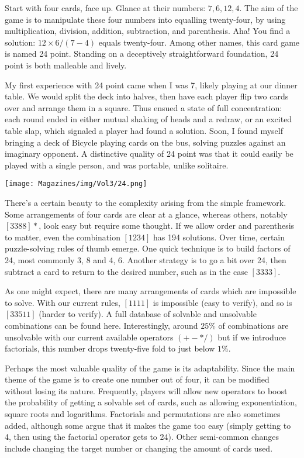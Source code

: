 \documentclass{article}
\begin{document}
\begin{multicols}{3}
Start with four cards, face up. Glance at their numbers: $7, 6, 12, 4$. The aim of the game is to manipulate these four numbers into equalling twenty-four, by using multiplication, division, addition, subtraction, and parenthesis. Aha! You find a solution:  $12 \times 6 / (7-4)$ equals twenty-four. Among other names, this card game is named 24 point. Standing on a deceptively straightforward foundation, 24 point is both malleable and lively. 

My first experience with 24 point came when I was 7, likely playing at our dinner table. We would split the deck into halves, then have each player flip two cards over and arrange them in a square. Thus ensued a state of full concentration: each round ended in either mutual shaking of heads and a redraw, or an excited table slap, which signaled a player had found a solution. Soon, I found myself bringing a deck of Bicycle playing cards on the bus, solving puzzles against an imaginary opponent. A distinctive quality of 24 point was that it could easily be played with a single person, and was portable, unlike solitaire. 

\begin{center}
\texttt{[image: Magazines/img/Vol3/24.png]}
\end{center}

There’s a certain beauty to the complexity arising from the simple framework. Some arrangements of four cards are clear at a glance, whereas others, notably $[3 3 8 8]*$, look easy but require some thought. If we allow order and parenthesis to matter, even the combination $[1 2 3 4]$ has 194 solutions. Over time, certain puzzle-solving rules of thumb emerge. One quick technique is to build factors of 24, most commonly 3, 8 and 4, 6. Another strategy is to go a bit over 24, then subtract a card to return to the desired number, such as in the case $[3 3 3 3]$.

As one might expect, there are many arrangements of cards which are impossible to solve. With our current rules, $[1 1 1 1]$ is impossible (easy to verify), and so is $[3 3 5 11]$ (harder to verify). A full database of solvable and unsolvable combinations can be found here. Interestingly, around $25\%$ of combinations are unsolvable with our current available operators $(+ - * /)$ but if we introduce factorials, this number drops twenty-five fold to just below $1\%$. 

Perhaps the most valuable quality of the game is its adaptability. Since the main theme of the game is to create one number out of four, it can be modified without losing its nature. Frequently, players will allow new operators to boost the probability of getting a solvable set of cards, such as allowing exponentiation, square roots and logarithms. Factorials and permutations are also sometimes added, although some argue that it makes the game too easy (simply getting to 4, then using the factorial operator gets to 24). Other semi-common changes include changing the target number or changing the amount of cards used.


\end{multicols}
\end{document}
